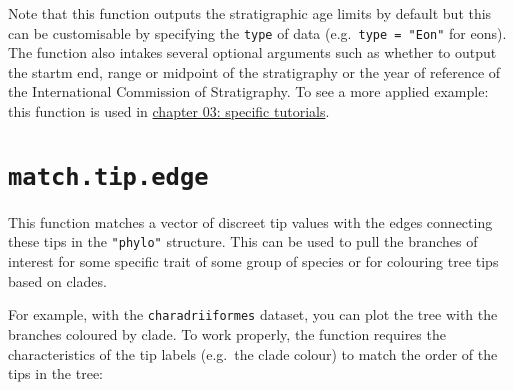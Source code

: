 \documentclass[
]{book}
\newenvironment{Shaded}{\begin{snugshade}}{\end{snugshade}}
\newcommand{\DocumentationTok}[1]{\textcolor[rgb]{0.56,0.35,0.01}{\textbf{\textit{#1}}}}
\newcommand{\FunctionTok}[1]{\textcolor[rgb]{0.13,0.29,0.53}{\textbf{#1}}}
\newcommand{\NormalTok}[1]{#1}
\newcommand{\OtherTok}[1]{\textcolor[rgb]{0.56,0.35,0.01}{#1}}
\newcommand{\SpecialCharTok}[1]{\textcolor[rgb]{0.81,0.36,0.00}{\textbf{#1}}}
\newcommand{\StringTok}[1]{\textcolor[rgb]{0.31,0.60,0.02}{#1}}
\begin{document}
Note that this function outputs the stratigraphic age limits by default but this can be customisable by specifying the \texttt{type} of data (e.g.~\texttt{type\ =\ "Eon"} for eons).
The function also intakes several optional arguments such as whether to output the startm end, range or midpoint of the stratigraphy or the year of reference of the International Commission of Stratigraphy.
To see a more applied example: this function is used in \protect\hyperlink{chrono-subsets}{chapter 03: specific tutorials}.

\hypertarget{match.tip.edge}{%
\section{\texorpdfstring{\texttt{match.tip.edge}}{match.tip.edge}}\label{match.tip.edge}}

This function matches a vector of discreet tip values with the edges connecting these tips in the \texttt{"phylo"} structure.
This can be used to pull the branches of interest for some specific trait of some group of species or for colouring tree tips based on clades.

For example, with the \texttt{charadriiformes} dataset, you can plot the tree with the branches coloured by clade.
To work properly, the function requires the characteristics of the tip labels (e.g.~the clade colour) to match the order of the tips in the tree:

\begin{Shaded}
\end{Shaded}
\end{document}

